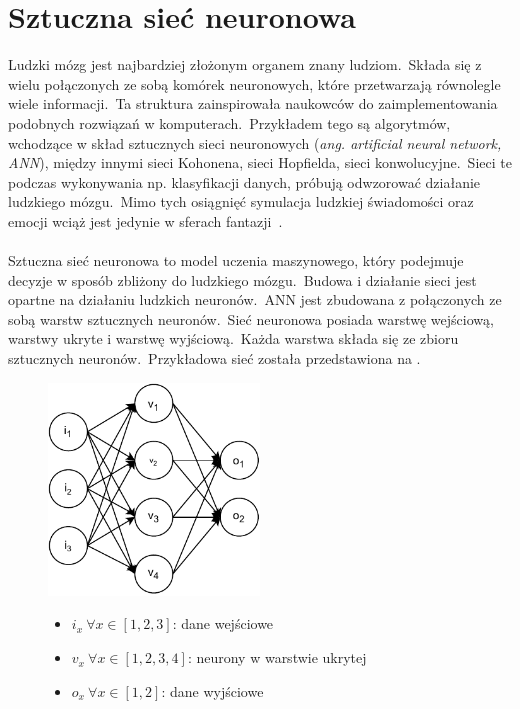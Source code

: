 \section{Sztuczna sieć neuronowa}
\label{sec:snn}
Ludzki mózg jest najbardziej złożonym organem znany ludziom.\ Składa się z wielu połączonych ze sobą komórek neuronowych, które przetwarzają równolegle wiele informacji.\ Ta struktura zainspirowała naukowców do zaimplementowania podobnych rozwiązań w komputerach.\ Przykładem tego są algorytmów, wchodzące w skład sztucznych sieci neuronowych (\textit{ang. artificial neural network, ANN}), między innymi sieci Kohonena, sieci Hopfielda, sieci konwolucyjne.\ Sieci te podczas wykonywania np. klasyfikacji danych, próbują odwzorować działanie ludzkiego mózgu.\ Mimo tych osiągnięć symulacja ludzkiej świadomości oraz emocji wciąż jest jedynie w sferach fantazji~\cite{Wang2003}.
\\ \\
Sztuczna sieć neuronowa to model uczenia maszynowego, który podejmuje decyzje w sposób zbliżony do ludzkiego mózgu.\ Budowa i działanie sieci jest opartne na działaniu ludzkich neuronów.\ ANN jest zbudowana z połączonych ze sobą warstw sztucznych neuronów.\ Sieć neuronowa posiada warstwę wejściową, warstwy ukryte i warstwę wyjściową.\ Każda warstwa składa się ze zbioru sztucznych neuronów.\ Przykładowa sieć została przedstawiona na .
\begin{figure}[H]
    \centering
    \includegraphics[width=0.5\textwidth]{images/neural-network}
    \begin{itemize}
        \item[] $i_x \ \forall x \in [1, 2, 3]$: dane wejściowe
        \item[] $v_x \ \forall x \in [1, 2, 3, 4]$: neurony w warstwie ukrytej
        \item[] $o_x \ \forall x \in [1, 2]$: dane wyjściowe
    \end{itemize}
    \label{fig:neural-network}
\end{figure}


